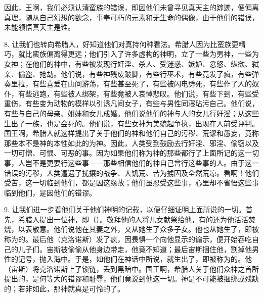 因此，王啊，我们必须认清蛮族的错误，即因他们未曾寻见真天主的踪迹，便偏离真理，随从自己幻想的欲念，事奉可朽的元素和无生命的偶像，由于他们的错误，未能领悟真天主是谁。\par

8. 让我们也转向希腊人，好知道他们对真持何种看法。希腊人因为比蛮族更精巧，就比蛮族偏离得更远；他们引入了许多虚构的神明，立了一些为男神，一些为女神；在他们的神中，有些被发现行奸淫、杀人、受迷惑、嫉妒、忿怒、纵欲、弑亲、偷盗、抢劫。他们说，有些神残废跛脚，有些行巫术，有些竟发了疯，有些弹奏里拉，有些喜爱在山间游荡，有些甚至死了，有些被闪电劈死，有些作了人的奴仆，有些逃跑，有些被人绑架，有些竟被人哀悼悲叹。他们说，有些下到，有些受重伤，有些变为动物的模样以引诱凡间女子，有些与男性同寝玷污自己。他们说，有些与自己的母亲、姐妹和女儿成婚。他们说他们的神与人的女儿行奸淫；从这些生出了一族，也是会死的。他们说，有些女神为美貌起争执，出现在人前受评判。国王啊，希腊人就这样提出了关于他们的神和他们自己的污秽、荒谬和愚妄，竟称那些本不是神的本性如此的为神。因此，人类受到鼓励去行奸淫、邪淫、偷窃以及一切可憎、可恨、可恶的事。因为如果他们称为神的那些都行了上面所记的这一切事，人岂不是更要行这些事——那些相信他们的神自己曾行这些事的人。由于这一错误的污秽，人类遭遇了扰攘的战争、大饥荒、苦为掳囚及全然荒凉。看啊！他们受苦，这一切临到他们，都是因这缘故；他们虽忍受这些事，心里却不省悟这些事临到他们，是因他们的错谬。\par

9. 让我们进一步看他们关于他们神明的记载，以便仔细证明上面所说的一切。首先，希腊人提出一位神，即（）。敬拜他的人将儿女献祭给他，有的还为他活活焚烧，以表敬意。他们说他在其妻之外，又从她生了众多子女。他也从她生了，即被称为的。最后他（克洛诺斯）发了疯，因畏惧一个向他显示的谕示，便开始吞吃自己的儿子们。宙斯被偷偷从他身边带走，他竟不知道；最后宙斯捆住他，割掉他男性的记号，抛入海中。于是，如他们在神话中所说，就生出了，即被称为的。他（宙斯）将克洛诺斯上了锁链，丢到黑暗中。国王啊，希腊人关于他们众神之首所提出的，是何等大的错谬和耻辱，他们竟说到他这一切。神是不可能被捆绑或残缺的；若非如此，那神就真是可怜的了。\par

